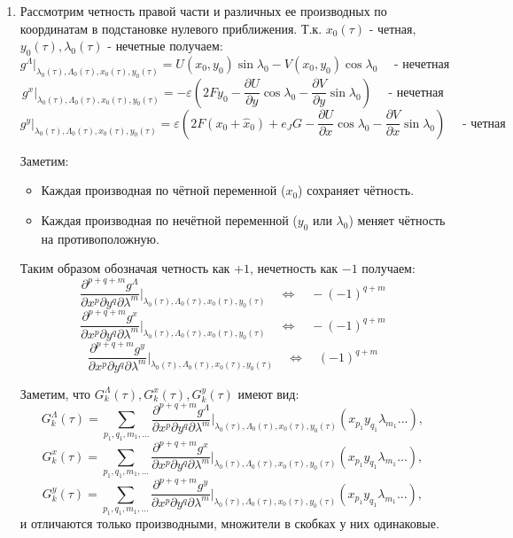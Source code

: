 \begin{enumerate}
\item Рассмотрим четность правой части и различных ее производных по координатам в подстановке нулевого приближения.
Т.к. $x_0(\tau)$ - четная, $y_0(\tau), \lambda_0(\tau)$ - нечетные получаем:
$$g^\Lambda|_{\lambda_0(\tau),\Lambda_0(\tau),x_0(\tau),y_0(\tau)} = U(x_0,y_0)\sin\lambda_0-V(x_0,y_0)\cos\lambda_0 \quad \text{ - нечетная}$$
$$g^x|_{\lambda_0(\tau),\Lambda_0(\tau),x_0(\tau),y_0(\tau)} = -\varepsilon \left( 2Fy_0-\frac{\partial U}{\partial y} \cos \lambda_0 - \frac{\partial V}{\partial y} \sin \lambda_0 \right) \quad \text{ - нечетная}$$
$$g^y|_{\lambda_0(\tau),\Lambda_0(\tau),x_0(\tau),y_0(\tau)} = \varepsilon \left( 2F(x_0+\hat x_0)+e_JG -\frac{\partial U}{\partial x} \cos \lambda_0 - \frac{\partial V}{\partial x} \sin \lambda_0 \right) \quad \text{ - четная}$$

Заметим:
\begin{itemize}
    \item Каждая производная по чётной переменной ($x_0$) сохраняет чётность.
    \item Каждая производная по нечётной переменной ($y_0$ или $\lambda_0$) меняет чётность на противоположную.
\end{itemize}
Таким образом обозначая четность как $+1$, нечетность как $-1$ получаем:
$$\frac{\partial^{p+q+m}g^\Lambda}{\partial x^p \partial y^q \partial \lambda^m}\bigg|_{\lambda_0(\tau),\Lambda_0(\tau),x_0(\tau),y_0(\tau)} \quad \Leftrightarrow \quad -(-1)^{q+m}$$
\begin{equation}
\frac{\partial^{p+q+m}g^x}{\partial x^p \partial y^q \partial \lambda^m}\bigg|_{\lambda_0(\tau),\Lambda_0(\tau),x_0(\tau),y_0(\tau)} \quad \Leftrightarrow \quad -(-1)^{q+m} \label{chetnost}
\end{equation}
$$\frac{\partial^{p+q+m}g^y}{\partial x^p \partial y^q \partial \lambda^m}\bigg|_{\lambda_0(\tau),\Lambda_0(\tau),x_0(\tau),y_0(\tau)} \quad \Leftrightarrow \quad (-1)^{q+m}$$

Заметим, что $G_k^\Lambda(\tau),G_k^x(\tau),G_k^y(\tau)$ имеют вид:
$$G_k^\Lambda(\tau) = \sum_{p_1,q_1,m_1,...} \frac{\partial^{p+q+m}g^\Lambda}{\partial x^p \partial y^q \partial \lambda^m}\bigg|_{\lambda_0(\tau),\Lambda_0(\tau),x_0(\tau),y_0(\tau)} (x_{p_1}y_{q_1}\lambda_{m_1}...),$$
$$G_k^x(\tau) = \sum_{p_1,q_1,m_1,...} \frac{\partial^{p+q+m}g^x}{\partial x^p \partial y^q \partial \lambda^m}\bigg|_{\lambda_0(\tau),\Lambda_0(\tau),x_0(\tau),y_0(\tau)} (x_{p_1}y_{q_1}\lambda_{m_1}...),$$
$$G_k^y(\tau) = \sum_{p_1,q_1,m_1,...} \frac{\partial^{p+q+m}g^y}{\partial x^p \partial y^q \partial \lambda^m}\bigg|_{\lambda_0(\tau),\Lambda_0(\tau),x_0(\tau),y_0(\tau)} (x_{p_1}y_{q_1}\lambda_{m_1}...),$$
и отличаются только производными, множители в скобках у них одинаковые.


\end{enumerate}
